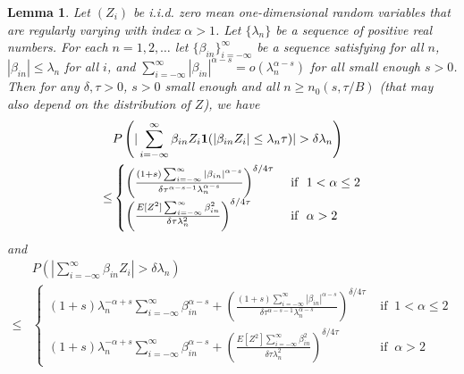 \documentclass[11pt,reqno]{amsart}
\numberwithin{equation}{section}
\newtheorem{lemma}{Lemma}[section] %
\theoremstyle{definition}
\theoremstyle{remark}
\theoremstyle{definition}
\newcommand{\one}{{\bf 1}}
\begin{document}
\begin{lemma} \label{lemma:WLLN_longmem}
Let $(Z_i)$  be i.i.d.  zero mean one-dimensional random variables that are 
  regularly varying with index $\alpha>1$. Let $\{\lambda_n\}$ be a
  sequence of positive real numbers. For each $n=1,2,\ldots$ let 
  $\{\beta_{in}\}_{i =
    -\infty}^\infty $ be a sequence satisfying for all  
  $n$, $|\beta_{in}| \leq
  \lambda_n$  for all $i$, and $\sum_{i = -\infty}^\infty
  |\beta_{in}|^{\alpha - s} = o(\lambda_n^{\alpha -s})$ for all small
  enough $s > 0$. Then for any $\delta, \tau> 0$, $s>0$ small enough
  and all $n\geq
n_0(s,\tau/B)$ (that may also depend on the distribution of $Z$), we have 
   \begin{equation}\label{eq:WLLN_bdd}
  \begin{aligned}
    &  P\left(|\sum_{i = -\infty}^\infty \beta_{in} Z_i\one(|\beta_{in} Z_i| \leq \lambda_n \tau)| > \delta\lambda_n\right) \\
      \leq & \begin{cases}
    \left(\frac{(1+s)\sum_{i = -\infty}^\infty |\beta_{in}|^{\alpha -
          s}}{ \delta \tau^{\alpha-s-1} \lambda_n^{\alpha -
          s}}\right)^{\delta/4\tau} & \text{ if } \ 1< \alpha \leq 2\\
    \left(\frac{E[Z^2] \sum_{i=-\infty}^\infty\beta_{in}^2}{\delta
        \tau\lambda_n^2} \right)^{\delta/4\tau} & \text{ if } \ \alpha > 2
      \end{cases}
  \end{aligned}  
\end{equation}
and 
  \begin{equation}\label{eq:WLLN_tot}
  \begin{aligned}
       & P\left(|\sum_{i = -\infty}^\infty \beta_{in} Z_i| > \delta\lambda_n\right) \\
       \leq & \begin{cases}
           (1+s) \lambda_n^{- \alpha + s}  \sum_{i = -\infty}^\infty
           \beta_{in}^{\alpha - s}  +   \left(\frac{(1+s)\sum_{i = -\infty}^\infty |\beta_{in}|^{\alpha - s}}{ \delta \tau^{\alpha-s-1} \lambda_n^{\alpha - s}}\right)^{\delta/4\tau}
 & \text{ if } \ 1 < \alpha \leq 2\\
            (1+s) \lambda_n^{- \alpha + s}  \sum_{i = -\infty}^\infty
            \beta_{in}^{\alpha - s}  +  \left(\frac{E[Z^2]
                \sum_{i=-\infty}^\infty\beta_{in}^2}{\delta
                \tau\lambda_n^2} \right)^{\delta/4\tau} 
& \text{ if }\ \alpha > 2
       \end{cases} 
  \end{aligned}
  \end{equation}
 
\end{lemma}
\end{document}

